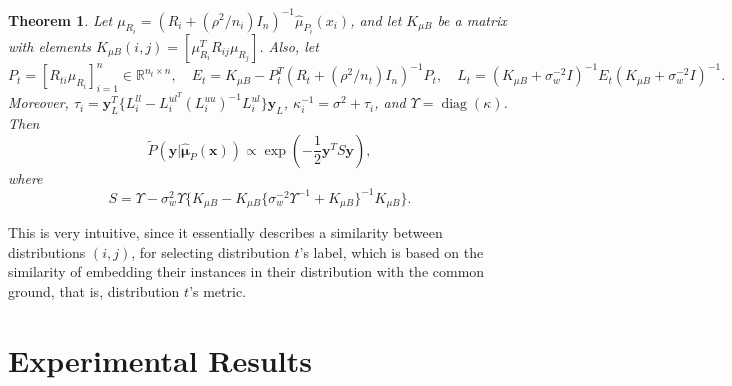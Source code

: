 \documentclass[10pt,twocolumn]{IEEEtran}
\newtheorem{theorem}{Theorem}
\DeclareMathOperator{\diag}{diag}
\begin{document}
	\begin{theorem} \label{thm:p-approx-dist}
		Let $\mu_{R_i} = (R_i + (\rho^2 / n_i) I_n)^{-1} \hat{\mu}_{P_i}(x_i)$, and let $K_{\mu B}$ be a matrix with elements $K_{\mu B}(i, j) = [\mu_{R_i}^T R_{ij} \mu_{R_j}]$. Also, let
		\begin{equation}
			P_t = [R_{ti} \mu_{R_i}]_{i=1}^{n} \in \mathbb{R}^{n_t \times n}, \quad E_t = K_{\mu B} - P_t^T (R_t + (\rho^2 / n_t) I_n)^{-1} P_t, \quad L_t = (K_{\mu B} + \sigma_w^{-2} I)^{-1} E_t (K_{\mu B} + \sigma_w^{-2} I)^{-1}.
		\end{equation}
		Moreover, $\tau_i = \mathbf{y}_L^T \{ L_i^{ll} - L_i^{ul^T} (L_i^{uu})^{-1} L_i^{ul} \} \mathbf{y}_L$, $\kappa_i^{-1} = \sigma^2 + \tau_i$, and $\Upsilon = \diag(\kappa)$. Then
		\begin{equation}
			\tilde{P}(\mathbf{y}|\hat{\boldsymbol{\mu}}_P(\mathbf{x})) \propto \exp\left( -\frac12 \mathbf{y}^T S \mathbf{y} \right),
		\end{equation}
		where
		\begin{equation}
			S = \Upsilon - \sigma_w^2 \Upsilon \{ K_{\mu B} - K_{\mu B} \{ \sigma_w^{-2} \Upsilon^{-1} + K_{\mu B} \}^{-1} K_{\mu B} \}.
		\end{equation}
	\end{theorem}
	
	This is very intuitive, since it essentially describes a similarity between distributions $(i, j)$, for selecting distribution $t$'s label, which is based on the similarity of embedding their instances in their distribution with the common ground, that is, distribution $t$'s metric.
	
	\section{Experimental Results}
	
\end{document}

